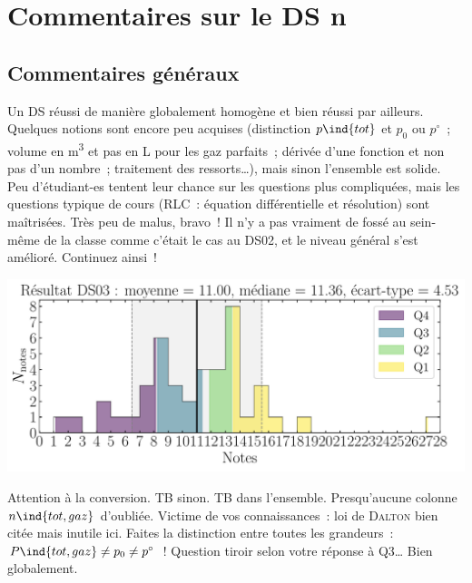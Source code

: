 \documentclass[a4paper, 10pt, final, garamond]{book}
\begin{document}
\setcounter{chapter}{2}

\chapter{Commentaires sur le DS n}

\section{Commentaires généraux}
Un DS réussi de manière globalement homogène et bien réussi par ailleurs.
Quelques notions sont encore peu acquises (distinction $p\ind{tot}$ et $p_0$ ou
$p^\circ$~; volume en \si{m^3} et pas en \si{L} pour les gaz parfaits~; dérivée
d'une fonction et non pas d'un nombre~; traitement des ressorts…), mais sinon
l'ensemble est solide. Peu d'étudiant-es tentent leur chance sur les questions
plus compliquées, mais les questions typique de cours (RLC~: équation
différentielle et résolution) sont maîtrisées. Très peu de malus, bravo~! Il n'y
a pas vraiment de fossé au sein-même de la classe comme c'était le cas au DS02,
et le niveau général s'est amélioré. Continuez ainsi~!

\begin{center}
	\includegraphics[width=\linewidth]{DS03_rslt.pdf}
\end{center}

\setcounter{section}{0}
\begin{enumerate}
	Attention à la conversion. TB sinon.
	TB dans l'ensemble. Presqu'aucune colonne $n\ind{tot, gaz}$
	d'oubliée.
	Victime de vos connaissances~: loi de \textsc{Dalton} bien citée
	mais inutile ici. Faites la distinction entre toutes les grandeurs~:
	$P\ind{tot, gaz} \neq p_0 \neq p^\circ$~!
	Question tiroir selon votre réponse à Q3…
	Bien globalement.
\end{enumerate}
\end{document}
